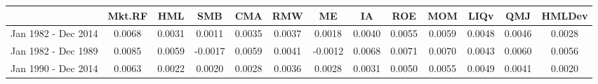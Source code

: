\begin{tabular}{ccccccccccccc}
  \hline
 & Mkt.RF & HML & SMB & CMA & RMW & ME & IA & ROE & MOM & LIQv & QMJ & HMLDev \\ 
  \hline
Jan 1982 - Dec 2014 & 0.0068 & 0.0031 & 0.0011 & 0.0035 & 0.0037 & 0.0018 & 0.0040 & 0.0055 & 0.0059 & 0.0048 & 0.0046 & 0.0028 \\ 
  Jan 1982 - Dec 1989 & 0.0085 & 0.0059 & -0.0017 & 0.0059 & 0.0041 & -0.0012 & 0.0068 & 0.0071 & 0.0070 & 0.0043 & 0.0060 & 0.0056 \\ 
  Jan 1990 - Dec 2014 & 0.0063 & 0.0022 & 0.0020 & 0.0028 & 0.0036 & 0.0028 & 0.0031 & 0.0050 & 0.0055 & 0.0049 & 0.0041 & 0.0020 \\ 
   \hline
\end{tabular}

